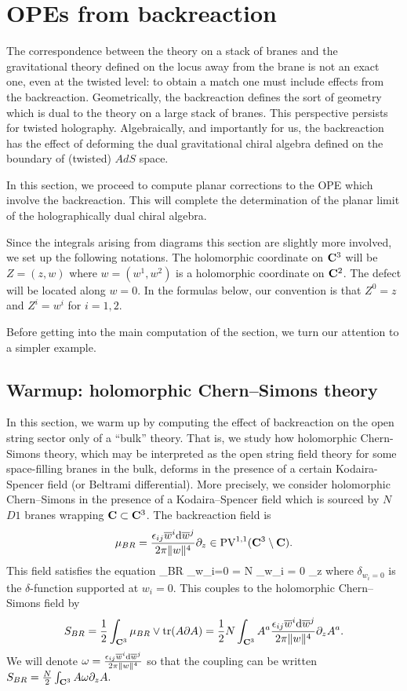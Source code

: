 \documentclass[../main.tex]{subfiles}
\begin{document}
\section{OPEs from backreaction}\label{sec:br}

The correspondence between the theory on a stack of branes and the gravitational theory defined on the locus away from the brane is not an exact one, even at the twisted level: to obtain a match one must include effects from the backreaction.
Geometrically, the backreaction defines the sort of geometry which is dual to the theory on a large stack of branes.
This perspective persists for twisted holography.
Algebraically, and importantly for us, the backreaction has the effect of deforming the dual gravitational chiral algebra defined on the boundary of (twisted) $AdS$ space.

In this section, we proceed to compute planar corrections to the OPE which involve the backreaction. 
This will complete the determination of the planar limit of the holographically dual chiral algebra.

Since the integrals arising from diagrams this section are slightly more involved, we set up the following notations.
The holomorphic coordinate on $\mathbf{C}^3$ will be $Z = (z , w)$ where $w = (w^1,w^2)$ is a holomorphic coordinate on $\mathbf{C}^2$.
The defect will be located along $w = 0$.
In the formulas below, our convention is that $Z^0 = z$ and $Z^i = w^i$ for $i=1,2$.

Before getting into the main computation of the section, we turn our attention to a simpler example.

\subsection{Warmup: holomorphic Chern--Simons theory}

In this section, we warm up by computing the effect of backreaction on the open string sector only of a ``bulk'' theory. That is, we study how holomorphic Chern-Simons theory, which may be interpreted as the open string field theory for some space-filling branes in the bulk, deforms in the presence of a certain Kodaira-Spencer field (or Beltrami differential). 
More precisely, we consider holomorphic Chern--Simons in the presence of a Kodaira--Spencer field which is sourced by $N$ $D1$ branes wrapping $\mathbf{C} \subset \mathbf{C}^3$. 
The backreaction field is 
\[
\mu_{BR} = \frac{{\epsilon}_{ij} \overline{w}^i \mathrm{d} \overline{w}^j}{2 \pi \|w\|^4} \partial_z \in {\rm PV}^{1,1} (\mathbf{C}^3 \setminus \mathbf{C}) . 
\]
This field satisfies the equation
\beqn\label{eqn:csBR}
\dbar \mu_{BR} \wedge \Omega_{w_i=0} = N \delta_{w_i = 0} \del_z 
\eeqn
where $\delta_{w_i=0}$ is the $\delta$-function supported at $w_i=0$.
This couples to the holomorphic Chern--Simons field by 
\[
S_{BR} = \frac12 \int_{\mathbf{C}^3} \mu_{BR} \vee \operatorname{tr}(A \partial A) = \frac12 N \int_{\mathbf{C}^3} A^a \frac{{\epsilon}_{ij} \overline{w}^i \mathrm{d} \overline{w}^j}{2\pi \|w\|^4} \partial_z A^a .
\]
We will denote $\omega = \frac{{\epsilon}_{ij} \overline{w}^i \mathrm{d} \overline{w}^j}{2 \pi \|w\|^4}$ so that the coupling can be written $S_{BR} = \frac{N}{2}
\int_{\mathbf{C}^3} A \omega \partial_z A.$
\end{document}
